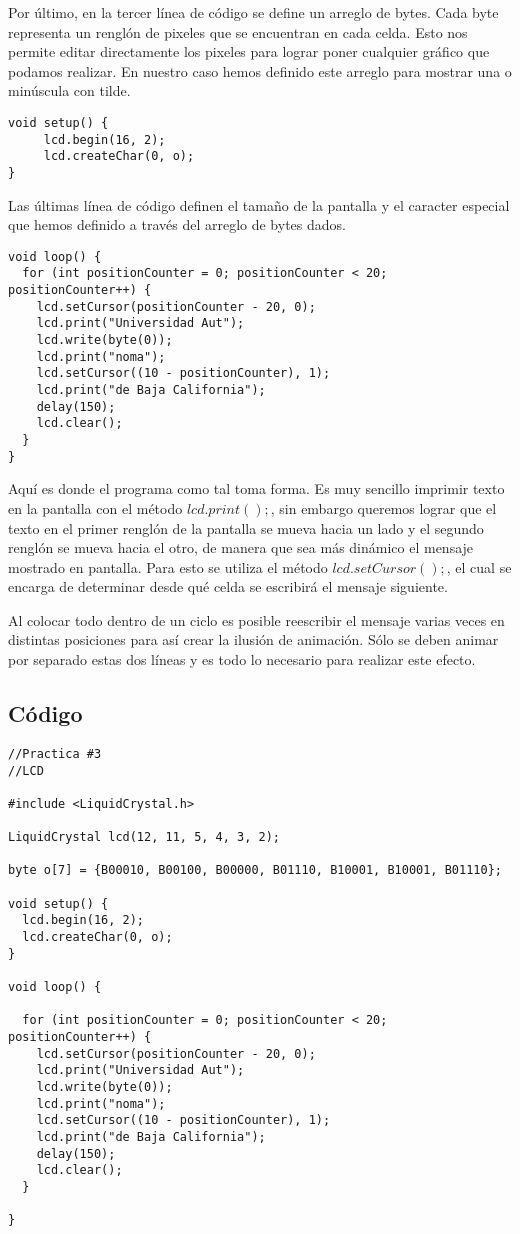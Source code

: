 \documentclass[12pt, letterpaper]{article}
\begin{document}
Por último, en la tercer línea de código se define un arreglo de bytes. Cada byte representa un renglón de pixeles que se encuentran en cada celda. Esto nos permite editar directamente los pixeles para lograr poner cualquier gráfico que podamos realizar. En nuestro caso hemos definido este arreglo para mostrar una o minúscula con tilde.

\begin{lstlisting}[language=Arduino]
	void setup() {
	 lcd.begin(16, 2);
 	 lcd.createChar(0, o);
}

\end{lstlisting}

Las últimas línea de código  definen el tamaño de la pantalla y el caracter especial que hemos definido a través del arreglo de bytes dados.

\begin{lstlisting}[language=Arduino]
void loop() { 
  for (int positionCounter = 0; positionCounter < 20; positionCounter++) {
    lcd.setCursor(positionCounter - 20, 0);
    lcd.print("Universidad Aut");
    lcd.write(byte(0));
    lcd.print("noma");
    lcd.setCursor((10 - positionCounter), 1);
    lcd.print("de Baja California");
    delay(150);
    lcd.clear();
  }
}
\end{lstlisting}

Aquí es donde el programa como tal toma forma. Es muy sencillo imprimir texto en la pantalla con el método $lcd.print();$, sin embargo queremos lograr que el texto en el primer renglón de la pantalla se mueva hacia un lado y el segundo renglón se mueva hacia el otro, de manera que sea más dinámico el mensaje mostrado en pantalla. Para esto se utiliza el método $lcd.setCursor();$, el cual se encarga de determinar desde qué celda se escribirá el mensaje siguiente.

Al colocar todo dentro de un ciclo es posible reescribir el mensaje varias veces en distintas posiciones para así crear la ilusión de animación. Sólo se deben animar por separado estas dos líneas y es todo lo necesario para realizar este efecto.

\subsection*{Código}

\begin{lstlisting}[language=Arduino]
//Practica #3
//LCD

#include <LiquidCrystal.h>

LiquidCrystal lcd(12, 11, 5, 4, 3, 2);

byte o[7] = {B00010, B00100, B00000, B01110, B10001, B10001, B01110};

void setup() {
  lcd.begin(16, 2);
  lcd.createChar(0, o);
}

void loop() {
  
  for (int positionCounter = 0; positionCounter < 20; positionCounter++) {
    lcd.setCursor(positionCounter - 20, 0);
    lcd.print("Universidad Aut");
    lcd.write(byte(0));
    lcd.print("noma");
    lcd.setCursor((10 - positionCounter), 1);
    lcd.print("de Baja California");
    delay(150);
    lcd.clear();
  }
  
}
\end{lstlisting}
\end{document}
